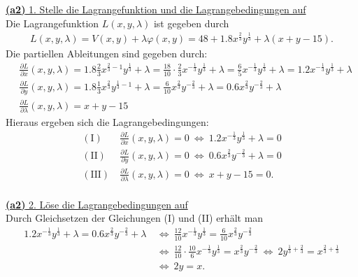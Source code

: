 \underline{\textbf{(a2)} 1. Stelle die Lagrangefunktion und die Lagrangebedingungen auf}\\
Die Lagrangefunktion $L(x,y, \lambda)$ ist gegeben durch
\begin{align*}
	L(x,y, \lambda) 
	=
	V(x,y) + \lambda \varphi(x,y)
	= 
	48 + 1.8 x^{\frac{2}{3}} y^{\frac{1}{3}} + \lambda(x+y-15).
\end{align*}
Die partiellen Ableitungen sind gegeben durch:
\begin{align*}
	&\frac{\partial L }{\partial x}(x,y,\lambda) = 
	1.8 \frac{2}{3} x^{\frac{2}{3} - 1 } y^{\frac{1}{3}} + \lambda
	= 
	\frac{18}{10} \cdot \frac{2}{3} x^{-\frac{1}{3}} y^{\frac{1}{3}} + \lambda
	= 
	\frac{6}{5}  x^{-\frac{1}{3}} y^{\frac{1}{3}} + \lambda
	= 
	1.2  x^{-\frac{1}{3}} y^{\frac{1}{3}} + \lambda
	\\
	&\frac{\partial L }{\partial y}(x,y,\lambda) 
	=
	1.8 \frac{1}{3} x^{\frac{2}{3}  } y^{\frac{1}{3}- 1} + \lambda
	=
	\frac{6}{10} x^{\frac{2}{3}  } y^{-\frac{2}{3}} + \lambda
	=
	0.6 x^{\frac{2}{3}  } y^{-\frac{2}{3}} + \lambda
	\\
	&\frac{\partial L }{\partial \lambda}(x,y,\lambda) = x + y -15
\end{align*}
Hieraus ergeben sich die Lagrangebedingungen:
\begin{align*}
	\mathrm{(I)}& \
	\frac{\partial L }{\partial x}(x,y,\lambda) = 0
	\ \Leftrightarrow \
	1.2  x^{-\frac{1}{3}} y^{\frac{1}{3}} + \lambda = 0
	\\
	\mathrm{(II)}& \
	\frac{\partial L }{\partial y}(x,y,\lambda) = 0
	\ \Leftrightarrow \
	0.6 x^{\frac{2}{3}  } y^{-\frac{2}{3}} + \lambda = 0
	\\
	\mathrm{(III)}& \
	\frac{\partial L }{\partial \lambda}(x,y,\lambda) = 0
	\ \Leftrightarrow \
	 x + y -15 = 0.
\end{align*}
\ \\
\underline{\textbf{(a2)} 2. Löse die Lagrangebedingungen auf}\\
Durch Gleichsetzen der Gleichungen (I) und (II) erhält man 
\begin{align*}
	1.2  x^{-\frac{1}{3}} y^{\frac{1}{3}} + \lambda
	=
	0.6 x^{\frac{2}{3}  } y^{-\frac{2}{3}} + \lambda
	\ &\Leftrightarrow \
	\frac{12}{10} x^{-\frac{1}{3}} y^{\frac{1}{3}}
	=
	\frac{6}{10} x^{\frac{2}{3}  } y^{-\frac{2}{3}} \\
	\ &\Leftrightarrow \
	\frac{12}{10} \cdot \frac{10}{6} x^{-\frac{1}{3}} y^{\frac{1}{3}}
	= 
	x^{\frac{2}{3}  } y^{-\frac{2}{3}} 
	\ \Leftrightarrow \
	2  y^{\frac{1}{3}+\frac{2}{3}}
	= 
	x^{\frac{2}{3} + \frac{1}{3} }  \\
	\ &\Leftrightarrow \
	2  y
	= 
	x.
\end{align*}
